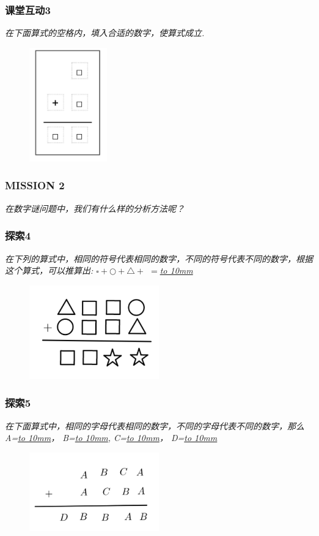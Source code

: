 \begin{frame}
    \frametitle{课堂互动3}
    \textit{在下面算式的空格内，填入合适的数字，使算式成立.}
    \begin{figure}[H] 
        \centering
        \includegraphics[width=0.3\textwidth]{./pics/Chapter_3/ketanghudong3.png}
    \end{figure}
\end{frame}


\begin{frame}
    \frametitle{MISSION 2}
    \textit{在数字谜问题中，我们有什么样的分析方法呢？}
\end{frame}

\begin{frame}
    \frametitle{探索4}
    \textit{在下列的算式中，相同的符号代表相同的数字，不同的符号代表不同的数字，根据这个算式，可以推算出: $\square + \bigcirc + \triangle +$  $=$\underline{\hbox to 10mm{}}}
    \begin{figure}[H] 
        \centering
        \includegraphics[width=0.5\textwidth]{./pics/Chapter_3/tansuo4.png}
    \end{figure}
\end{frame}

\begin{frame}
    \frametitle{探索5}
    \textit{在下面算式中，相同的字母代表相同的数字，不同的字母代表不同的数字，那么
    A=\underline{\hbox to 10mm{}}， 
    B=\underline{\hbox to 10mm{}},
    C=\underline{\hbox to 10mm{}}，
    D=\underline{\hbox to 10mm{}}}
    \begin{figure}[H] 
        \centering
        \includegraphics[width=0.5\textwidth]{./pics/Chapter_3/tansuo5.png}
    \end{figure}
\end{frame}

